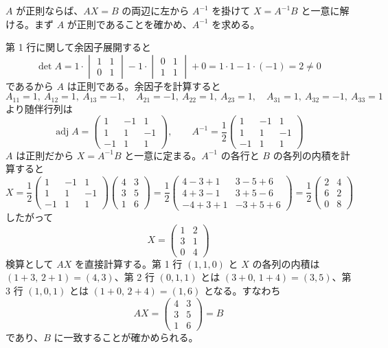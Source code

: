 
$A$ が正則ならば、$AX = B$ の両辺に左から $A^{-1}$ を掛けて $X = A^{-1}B$ と一意に解ける。まず $A$ が正則であることを確かめ、$A^{-1}$ を求める。

第 1 行に関して余因子展開すると
\[
\det A = 1\cdot\begin{vmatrix}1&1\\0&1\end{vmatrix} - 1\cdot\begin{vmatrix}0&1\\1&1\end{vmatrix} + 0
= 1\cdot 1 - 1\cdot(-1) = 2 \neq 0
\]
であるから $A$ は正則である。余因子を計算すると
\[
A_{11}=1,\ A_{12}=1,\ A_{13}=-1,\quad
A_{21}=-1,\ A_{22}=1,\ A_{23}=1,\quad
A_{31}=1,\ A_{32}=-1,\ A_{33}=1
\]
より随伴行列は
\[
\operatorname{adj}A =
\begin{pmatrix}
1 & -1 & 1 \\
1 & 1 & -1 \\
-1 & 1 & 1
\end{pmatrix},
\qquad
A^{-1} = \frac{1}{2}
\begin{pmatrix}
1 & -1 & 1 \\
1 & 1 & -1 \\
-1 & 1 & 1
\end{pmatrix}
\]
$A$ は正則だから $X = A^{-1}B$ と一意に定まる。$A^{-1}$ の各行と $B$ の各列の内積を計算すると
\[
X = \frac{1}{2}
\begin{pmatrix}
1 & -1 & 1 \\
1 & 1 & -1 \\
-1 & 1 & 1
\end{pmatrix}
\begin{pmatrix}
4 & 3 \\
3 & 5 \\
1 & 6
\end{pmatrix}
= \frac{1}{2}
\begin{pmatrix}
4-3+1 & 3-5+6 \\
4+3-1 & 3+5-6 \\
-4+3+1 & -3+5+6
\end{pmatrix}
= \frac{1}{2}
\begin{pmatrix}
2 & 4 \\
6 & 2 \\
0 & 8
\end{pmatrix}
\]
したがって
\[
\boxed{\; X =
\begin{pmatrix}
1 & 2 \\
3 & 1 \\
0 & 4
\end{pmatrix} \;}
\]
検算として $AX$ を直接計算する。第 1 行 $(1,1,0)$ と $X$ の各列の内積は $(1+3,\,2+1)=(4,3)$、第 2 行 $(0,1,1)$ とは $(3+0,\,1+4)=(3,5)$、第 3 行 $(1,0,1)$ とは $(1+0,\,2+4)=(1,6)$ となる。すなわち
\[
AX =
\begin{pmatrix}
4 & 3 \\
3 & 5 \\
1 & 6
\end{pmatrix} = B
\]
であり、$B$ に一致することが確かめられる。
